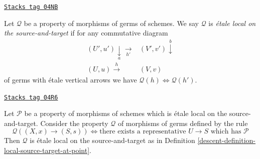 \begin{definition}
\label{descent-definition-local-source-target-at-point}
\href{https://stacks.math.columbia.edu/tag/04NB}{\texttt{Stacks tag 04NB}}

Let $\mathcal{Q}$ be a property of morphisms of germs of schemes.
We say $\mathcal{Q}$ is  {\it \'etale local on the source-and-target}
if for any commutative diagram
$$
\begin{array}{cc}(U', u') \underset{a}{\downarrow}\underset{h'}{\longrightarrow} & (V', v') \overset{b}{\downarrow} \\ (U, u) \overset{h}{\longrightarrow} & (V, v)\end{array}
$$
of germs with \'etale vertical arrows we have
$\mathcal{Q}(h) \Leftrightarrow \mathcal{Q}(h')$.
\end{definition}

\begin{lemma}
\label{descent-lemma-local-source-target-global-implies-local}
\href{https://stacks.math.columbia.edu/tag/04R6}{\texttt{Stacks tag 04R6}}

Let $\mathcal{P}$ be a property of morphisms of schemes
which is \'etale local on the source-and-target.
Consider the property $\mathcal{Q}$ of
morphisms of germs defined by the rule
$$
\mathcal{Q}((X, x) \to (S, s))
\Leftrightarrow
\text{there exists a representative }U \to S
\text{ which has }\mathcal{P}
$$
Then $\mathcal{Q}$ is \'etale local on the source-and-target as in
Definition \ref{descent-definition-local-source-target-at-point}.
\end{lemma}

